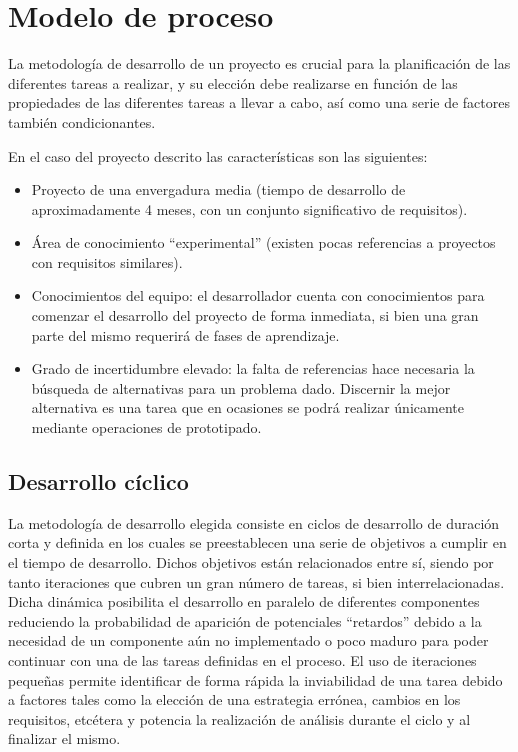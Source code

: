 \chapter{Modelo de proceso}

La metodología de desarrollo de un proyecto es crucial para la planificación de las diferentes tareas a realizar, y su elección debe realizarse en función de las propiedades de las diferentes tareas a llevar a cabo, así como una serie de factores también condicionantes.

En el caso del proyecto descrito las características son las siguientes:

\begin{itemize}

\item Proyecto de una envergadura media (tiempo de desarrollo de aproximadamente 4 meses, con un conjunto significativo de requisitos).
\item Área de conocimiento ``experimental'' (existen pocas referencias a proyectos con requisitos similares).
\item Conocimientos del equipo: el desarrollador cuenta con conocimientos para comenzar el desarrollo del proyecto de forma inmediata, si bien una gran parte del mismo requerirá de fases de aprendizaje.
\item Grado de incertidumbre elevado: la falta de referencias hace necesaria la búsqueda de alternativas para un problema dado. Discernir la mejor alternativa es una tarea que en ocasiones se podrá realizar únicamente mediante operaciones de prototipado.
\end{itemize}

\section{Desarrollo cíclico}

La metodología de desarrollo elegida consiste en ciclos de desarrollo de duración corta y definida en los cuales se preestablecen una serie de objetivos a cumplir en el tiempo de desarrollo. Dichos objetivos están relacionados entre sí, siendo por tanto iteraciones que cubren un gran número de tareas, si bien interrelacionadas. Dicha dinámica posibilita el desarrollo en paralelo de diferentes componentes reduciendo la probabilidad de aparición de potenciales ``retardos'' debido a la necesidad de un componente aún no implementado o poco maduro para poder continuar con una de las tareas definidas en el proceso. El uso de iteraciones pequeñas permite identificar de forma rápida la inviabilidad de una tarea debido a factores tales como la elección de una estrategia errónea, cambios en los requisitos, etcétera y potencia la realización de análisis durante el ciclo y al finalizar el mismo.

